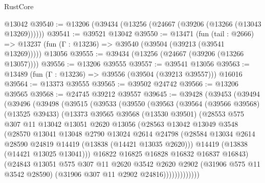 \begin{lexlean}{RustCore}
\begin{coremodule}
    @13042
@39540 := @13206 (@39434 (@13256 (@24667 (@39206 (@13266 (@13043 @13269))))))
@39541 := @39521 @13042
@39550 := @13471
    (fun (tail : @2666) => @13237 (fun (Γ : @13236) => @39540 (@39504 (@39213 (@39541 @13269)))))
    @13056
@39555 := @39434 (@13256 (@24667 (@39206 (@13266 @13057))))
@39556 := @13206 @39555
@39557 := @39541 @13056
@39563 := @13489 (fun (Γ : @13236) => @39556 (@39504 (@39213 @39557))) @16016
@39564 := @13373 @39555
@39565 := @39502 @24742
@39566 := @13206 @39565
@39568 := @24745 @39212 @39557
@39645 := @39428
    (@39453
      (@39494
        (@39496
          (@39498
            (@39515
              (@39533
                (@39550
                  (@39563
                    (@39564
                      (@39566 @39568)
                      (@13525 @39433)
                      (@13373
                        @39565
                        @39568
                        (@13530 @39501)
                        (@28553
                          @575
                          @307
                          @11
                          @13042
                          @13051
                          @2620
                          @13056
                          (@28563
                            @13042
                            @13049
                            @3548
                            (@28570
                              @13041
                              @13048
                              @2790
                              @13024
                              @2614
                              @24798
                              (@28584
                                @13034
                                @2614
                                @28590
                                @24819
                                @14419
                                (@13838 (@14421 @13035 @2620)))
                              @14419
                              (@13838 (@14421 @13025 @13041)))
                            @16822
                            @16825
                            @16828
                            @16832
                            @16837
                            @16843)
                          (@24843
                            @13051
                            @575
                            @307
                            @11
                            @2620
                            @3542
                            @2620
                            @2902
                            (@31906 @575 @11 @3542 @28590)
                            (@31906 @307 @11 @2902 @24816)))))))))))))

\end{coremodule}
\end{lexlean}
